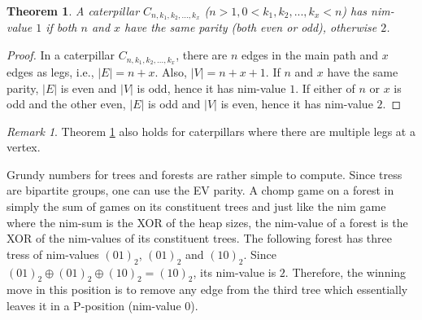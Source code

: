 \documentclass[a4paper, 12pt]{article}
\newtheorem{theorem}{Theorem}[section] %
\theoremstyle{remark} %
\newtheorem*{remark}{Remark}
\begin{document}
\begin{center}
\\
\end{center}

\begin{theorem}
	\label{caterpillarNimValueTheorem}
	A caterpillar $C_{n,k_1,k_2,...,k_x}$ ($n > 1, 0 < k_1, k_2, ... , k_x < n$) has nim-value $1$ if both $n$ and $x$ have the same parity (both even or odd), otherwise $2$.
\end{theorem}

\begin{proof}
	In a caterpillar $C_{n,k_1,k_2,...,k_x}$, there are $n$ edges in the main path and $x$ edges as legs, i.e., $|E| = n+x$. Also, $|V|=n+x+1$. If $n$ and $x$ have the same parity, $|E|$ is even and $|V|$ is odd, hence it has nim-value $1$. If either of $n$ or $x$ is odd and the other even, $|E|$ is odd and $|V|$ is even, hence it has nim-value $2$.
\end{proof}

\begin{remark}
	Theorem \ref{caterpillarNimValueTheorem} also holds for caterpillars where there are multiple legs at a vertex. 
\end{remark}

Grundy numbers for trees and forests   are rather simple to compute. Since tress are bipartite groups, one can use the EV parity. A chomp game on a forest in simply the sum of games on its constituent trees and just like the nim game where the nim-sum is the XOR of the heap sizes, the nim-value of a forest is the XOR of the nim-values of its constituent trees. The following forest has three tress of nim-values $(01)_2$, $(01)_2$ and $(10)_2$. Since $(01)_2 \oplus (01)_2 \oplus (10)_2 = (10)_2$, its nim-value is $2$. Therefore, the winning move in this position is to remove any edge from the third tree which essentially leaves it in a P-position (nim-value $0$).\\
\end{document}

